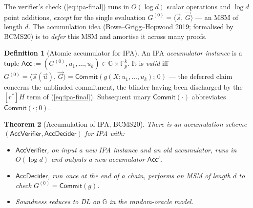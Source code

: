 \documentclass[11pt,a4paper]{article}
\newtheorem{theorem}{Theorem}[section]
\theoremstyle{definition}
\newtheorem{definition}[theorem]{Definition}
\newcommand{\F}{\mathbb{F}}
\newcommand{\G}{\mathbb{G}}
\newcommand{\ip}[2]{\langle #1,\, #2 \rangle}
\newcommand{\Comm}{\mathsf{Commit}}
\newcommand{\Acc}{\ensuremath{\mathsf{Acc}}}
\begin{document}
The verifier's check (\ref{eq:ipa-final}) runs in $O(\log d)$ scalar
operations and $\log d$ point additions, \emph{except} for the single
evaluation $G^{(0)} = \ip{\vec{s}}{\vec{G}}$ --- an MSM of length $d$.
The accumulation idea (Bowe--Grigg--Hopwood 2019; formalised by BCMS20)
is to \emph{defer} this MSM and amortise it across many proofs.

\begin{definition}[Atomic accumulator for IPA]\label{def:ipa-acc}
An IPA \emph{accumulator instance} is a tuple
$\Acc := (G^{(0)}, u_1, \dots, u_k) \in \G \times \F_p^k$. It is
\emph{valid} iff
$G^{(0)} = \ip{\vec{s}(\vec{u})}{\vec{G}} = \Comm(g(X; u_1, \dots, u_k);\, 0)$
--- the deferred claim concerns the unblinded commitment, the blinder
having been discharged by the $[r^*] H$ term of (\ref{eq:ipa-final}).
Subsequent unary $\Comm(\cdot)$ abbreviates $\Comm(\cdot\,; 0)$.
\end{definition}

\begin{theorem}[Accumulation of IPA, BCMS20]\label{thm:bcms20-acc}
There is an accumulation scheme
$(\mathsf{AccVerifier}, \mathsf{AccDecider})$ for IPA with:
\begin{itemize}[leftmargin=*]
\item $\mathsf{AccVerifier}$, on input a new IPA instance and an old
accumulator, runs in $O(\log d)$ and outputs a new accumulator $\Acc'$.
\item $\mathsf{AccDecider}$, run \emph{once} at the end of a chain, performs
an MSM of length $d$ to check $G^{(0)} = \Comm(g)$.
\item Soundness reduces to DL on $\G$ in the random-oracle model.
\end{itemize}
\end{theorem}
\end{document}
